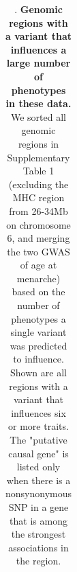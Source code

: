 \documentclass[11pt,titlepage]{article}
\begin{document}
\begin{center}
\begin{table}
{\begin{tabular}{| c| c| c|c| m{5cm}| m{5cm}|}
    \end{tabular}
    }
      \caption{. \textbf{Genomic regions with a variant that influences a large number of phenotypes in these data.} We sorted all genomic regions in Supplementary Table 1 (excluding the MHC region from 26-34Mb on chromosome 6, and merging the two GWAS of age at menarche) based on the number of phenotypes a single variant was predicted to influence. Shown are all regions with a variant that influences six or more traits. The "putative causal gene" is listed only when there is a nonsynonymous SNP in a gene that is among the strongest associations in the region.} 
\end{table}
\end{center}




\end{document}
